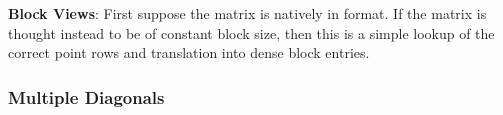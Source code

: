 \noindent
{\bf Block Views}:  First suppose the matrix is natively in \point format.  If the matrix is thought instead to be of
constant block size, then this is a simple lookup of the correct point rows and translation into dense block entries.


%
%

\subsubsection{Multiple Diagonals}

